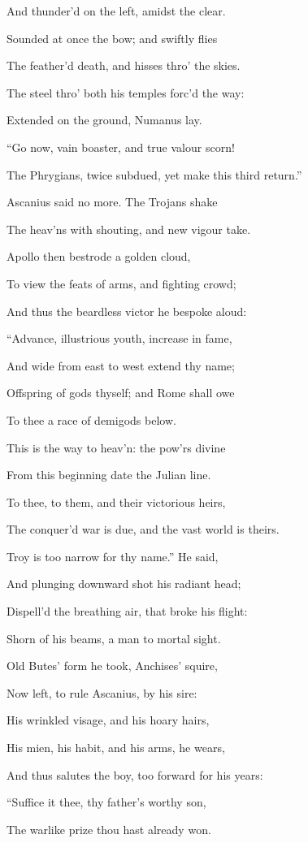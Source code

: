 And thunder’d on the left, amidst the clear.

Sounded at once the bow; and swiftly flies

The feather’d death, and hisses thro’ the skies.

The steel thro’ both his temples forc’d the way:

Extended on the ground, Numanus lay.

“Go now, vain boaster, and true valour scorn!

The Phrygians, twice subdued, yet make this third return.”

Ascanius said no more. The Trojans shake

The heav’ns with shouting, and new vigour take.

Apollo then bestrode a golden cloud,

To view the feats of arms, and fighting crowd;

And thus the beardless victor he bespoke aloud:

“Advance, illustrious youth, increase in fame,

And wide from east to west extend thy name;

Offspring of gods thyself; and Rome shall owe

To thee a race of demigods below.

This is the way to heav’n: the pow’rs divine

From this beginning date the Julian line.

To thee, to them, and their victorious heirs,

The conquer’d war is due, and the vast world is theirs.

Troy is too narrow for thy name.” He said,

And plunging downward shot his radiant head;

Dispell’d the breathing air, that broke his flight:

Shorn of his beams, a man to mortal sight.

Old Butes’ form he took, Anchises’ squire,

Now left, to rule Ascanius, by his sire:

His wrinkled visage, and his hoary hairs,

His mien, his habit, and his arms, he wears,

And thus salutes the boy, too forward for his years:

“Suffice it thee, thy father’s worthy son,

The warlike prize thou hast already won.

